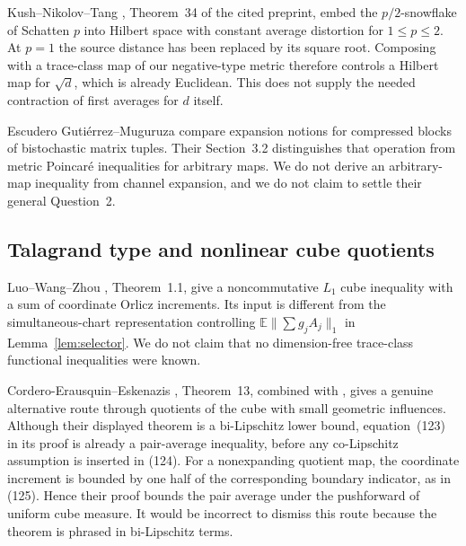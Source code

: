 \documentclass[11pt]{article}
\theoremstyle{remark}\newtheorem{remark}[theorem]{Remark}
\numberwithin{equation}{section}
\newcommand{\E}{\mathbb E}\newcommand{\Prob}{\mathbb P}
\newcommand{\norm}[1]{\lVert #1\rVert}
\begin{document}
Kush--Nikolov--Tang \cite{KNT}, Theorem~34 of the cited preprint, embed
the $p/2$-snowflake of Schatten $p$ into Hilbert space with constant
average distortion for $1\le p\le2$. At $p=1$ the source distance has
been replaced by its square root. Composing with a trace-class map of
our negative-type metric therefore controls a Hilbert map for $\sqrt d$,
which is already Euclidean. This does not supply the needed contraction
of first averages for $d$ itself.

Escudero Guti\'errez--Muguruza \cite{EGM} compare expansion notions for
compressed blocks of bistochastic matrix tuples. Their Section~3.2
distinguishes that operation from metric Poincar\'e inequalities for
arbitrary maps. We do not derive an arbitrary-map inequality from channel
expansion, and we do not claim to settle their general Question~2.

\subsection{Talagrand type and nonlinear cube quotients}
Luo--Wang--Zhou \cite{LWW}, Theorem~1.1, give a noncommutative
$L_1$ cube inequality with a sum of coordinate Orlicz increments. Its
input is different from the simultaneous-chart representation controlling
$\E\norm{\sum g_jA_j}_1$ in Lemma~\ref{lem:selector}. We do not claim
that no dimension-free trace-class functional inequalities were known.

Cordero-Erausquin--Eskenazis \cite{CEE}, Theorem~13, combined with
\cite{LWW}, gives a genuine alternative route through quotients of the
cube with small geometric influences. Although their displayed theorem
is a bi-Lipschitz lower bound, equation~(123) in its proof is already a
pair-average inequality, before any co-Lipschitz assumption is inserted
in (124). For a nonexpanding quotient map, the coordinate increment is
bounded by one half of the corresponding boundary indicator, as in
(125). Hence their proof bounds the pair average under the pushforward
of uniform cube measure. It would be incorrect to dismiss this route
because the theorem is phrased in bi-Lipschitz terms.
\end{document}
